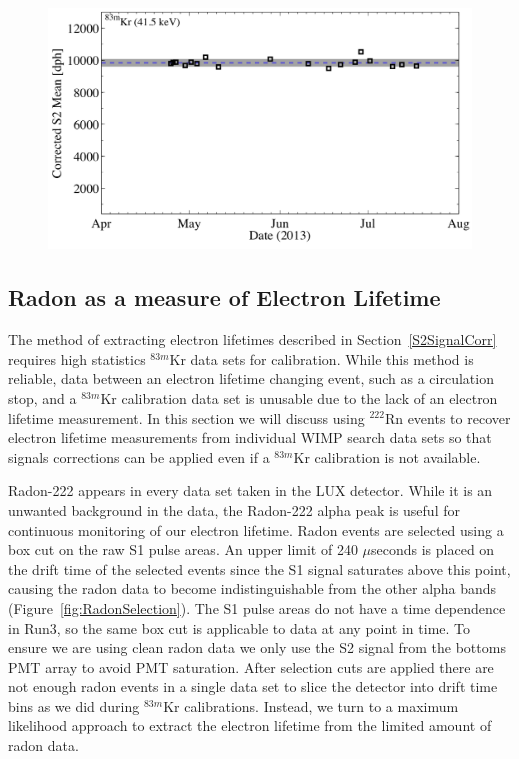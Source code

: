\begin{figure} [!h]
\includegraphics[scale=.3]{CorrectedS2_Stability.png} 
\label{KrS2Stability}
\end{figure}

\subsection{Radon as a measure of Electron Lifetime}

The method of extracting electron lifetimes described in Section~\ref{S2SignalCorr} requires high statistics $^{83m}$Kr data sets for calibration.  While this method is reliable, data between an electron lifetime changing event, such as a circulation stop, and a $^{83m}$Kr calibration data set is unusable due to the lack of an electron lifetime measurement.  In this section we will discuss using $^{222}$Rn events to recover electron lifetime measurements from individual WIMP search data sets so that signals corrections can be applied even if a $^{83m}$Kr calibration is not available.

Radon-222 appears in every data set taken in the LUX detector.  While it is an unwanted background in the data, the Radon-222 alpha peak is useful for continuous monitoring of our electron lifetime.  Radon events are selected using a box cut on the raw S1 pulse areas.  An upper limit of 240 $\mu$seconds is placed on the drift time of the selected events since the S1 signal saturates above this point, causing the radon data to become indistinguishable from the other alpha bands (Figure~\ref{fig:RadonSelection}).  The S1 pulse areas do not have a time dependence in Run3, so the same box cut is applicable to data at any point in time.  To ensure we are using clean radon data we only use the S2 signal from the bottoms PMT array to avoid PMT saturation.  After selection cuts are applied there are not enough radon events in a single data set to slice the detector into drift time bins as we did during $^{83m}$Kr calibrations.  Instead, we turn to a maximum likelihood approach to extract the electron lifetime from the limited amount of radon data.


